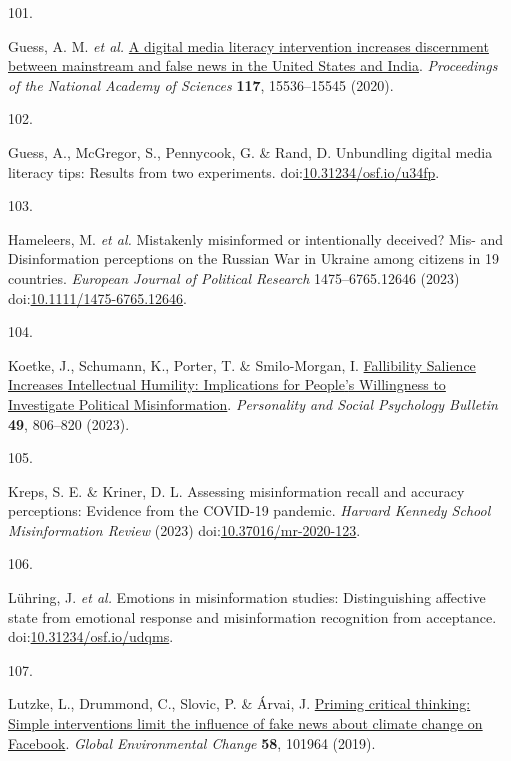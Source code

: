 \documentclass[
  man]{apa6}
\newlength{\cslhangindent}
\newlength{\csllabelwidth}
\newenvironment{CSLReferences}[2] %
 {\begin{list}{}{%
  \setlength{\itemindent}{0pt}
  \setlength{\leftmargin}{0pt}
  \setlength{\parsep}{0pt}
  \ifodd #1
   \setlength{\leftmargin}{\cslhangindent}
   \setlength{\itemindent}{-1\cslhangindent}
  \fi
  \setlength{\itemsep}{#2\baselineskip}}}
 {\end{list}}
\newcommand{\CSLLeftMargin}[1]{\parbox[t]{\csllabelwidth}{\strut#1\strut}}
\newcommand{\CSLRightInline}[1]{\parbox[t]{\linewidth - \csllabelwidth}{\strut#1\strut}}
\begin{document}
\begin{CSLReferences}{0}{0}
\CSLLeftMargin{101. }%
\CSLRightInline{*Guess, A. M. \emph{et al.} \href{https://doi.org/10.1073/pnas.1920498117}{A digital media literacy intervention increases discernment between mainstream and false news in the United States and India}. \emph{Proceedings of the National Academy of Sciences} \textbf{117}, 15536--15545 (2020).}

\CSLLeftMargin{102. }%
\CSLRightInline{*Guess, A., McGregor, S., Pennycook, G. \& Rand, D. Unbundling digital media literacy tips: Results from two experiments. doi:\href{https://doi.org/10.31234/osf.io/u34fp}{10.31234/osf.io/u34fp}.}

\CSLLeftMargin{103. }%
\CSLRightInline{*Hameleers, M. \emph{et al.} Mistakenly misinformed or intentionally deceived? Mis{-} and Disinformation perceptions on the Russian War in Ukraine among citizens in 19 countries. \emph{European Journal of Political Research} 1475--6765.12646 (2023) doi:\href{https://doi.org/10.1111/1475-6765.12646}{10.1111/1475-6765.12646}.}

\CSLLeftMargin{104. }%
\CSLRightInline{*Koetke, J., Schumann, K., Porter, T. \& Smilo-Morgan, I. \href{https://doi.org/10.1177/01461672221080979}{Fallibility Salience Increases Intellectual Humility: Implications for People{'}s Willingness to Investigate Political Misinformation}. \emph{Personality and Social Psychology Bulletin} \textbf{49}, 806--820 (2023).}

\CSLLeftMargin{105. }%
\CSLRightInline{*Kreps, S. E. \& Kriner, D. L. Assessing misinformation recall and accuracy perceptions: Evidence from the COVID-19 pandemic. \emph{Harvard Kennedy School Misinformation Review} (2023) doi:\href{https://doi.org/10.37016/mr-2020-123}{10.37016/mr-2020-123}.}

\CSLLeftMargin{106. }%
\CSLRightInline{*Lühring, J. \emph{et al.} Emotions in misinformation studies: Distinguishing affective state from emotional response and misinformation recognition from acceptance. doi:\href{https://doi.org/10.31234/osf.io/udqms}{10.31234/osf.io/udqms}.}

\CSLLeftMargin{107. }%
\CSLRightInline{*Lutzke, L., Drummond, C., Slovic, P. \& Árvai, J. \href{https://doi.org/10.1016/j.gloenvcha.2019.101964}{Priming critical thinking: Simple interventions limit the influence of fake news about climate change on Facebook}. \emph{Global Environmental Change} \textbf{58}, 101964 (2019).}


\end{CSLReferences}
\end{document}
